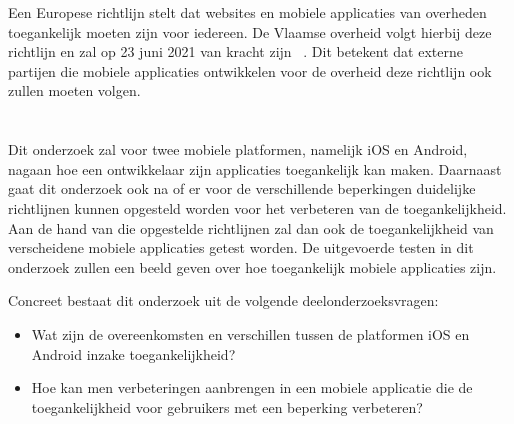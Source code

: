 Een Europese richtlijn stelt dat websites en mobiele applicaties van overheden toegankelijk moeten zijn voor iedereen. 
De Vlaamse overheid volgt hierbij deze richtlijn en zal op 23 juni 2021 van kracht zijn ~\autocite{vlaanderenVerplichting}. Dit betekent dat externe partijen die mobiele applicaties ontwikkelen voor de overheid deze richtlijn ook zullen moeten volgen. 


\section{}
\label{sec:onderzoeksvraag}



Dit onderzoek zal voor twee mobiele platformen, namelijk iOS en Android, nagaan hoe een ontwikkelaar zijn applicaties toegankelijk kan maken. Daarnaast gaat dit onderzoek ook na of er voor de verschillende beperkingen duidelijke richtlijnen kunnen opgesteld worden voor het verbeteren van de toegankelijkheid. Aan de hand van die opgestelde richtlijnen zal dan ook de toegankelijkheid van verscheidene mobiele applicaties getest worden. De uitgevoerde testen in dit onderzoek zullen een beeld geven over hoe toegankelijk mobiele applicaties zijn.

Concreet bestaat dit onderzoek uit de volgende deelonderzoeksvragen:
\begin{itemize}
    \item Wat zijn de overeenkomsten en verschillen tussen de platformen iOS en Android inzake toegankelijkheid?
    \item Hoe kan men verbeteringen aanbrengen in een mobiele applicatie die de toegankelijkheid voor gebruikers met een beperking verbeteren?
\end{itemize}


